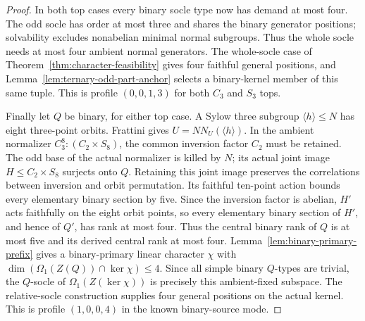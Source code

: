 \begin{proof}
In both top cases every binary socle type now has demand at most four.
The odd socle has order at most three and shares the binary generator
positions; solvability excludes nonabelian minimal normal subgroups.
Thus the whole socle needs at most four ambient normal generators.
The whole-socle case of Theorem~\ref{thm:character-feasibility} gives
four faithful general positions, and
Lemma~\ref{lem:ternary-odd-part-anchor} selects a binary-kernel member
of this same tuple. This is profile $(0,0,1,3)$ for both $C_3$ and
$S_3$ tops.

Finally let $Q$ be binary, for either top case. A Sylow three subgroup
$\langle h\rangle\leq N$ has eight three-point orbits. Frattini gives
$U=N N_U(\langle h\rangle)$. In the ambient normalizer
$C_3^8:(C_2\times S_8)$, the common inversion factor $C_2$ must be
retained. The odd base of the actual normalizer is killed by $N$;
its actual joint image $H\leq C_2\times S_8$ surjects onto $Q$.
Retaining this joint image preserves the correlations between inversion
and orbit permutation. Its faithful ten-point action bounds every
elementary binary section by five. Since the inversion factor is
abelian, $H'$ acts faithfully on the eight orbit points, so every
elementary binary section of $H'$, and hence of $Q'$, has rank at most
four. Thus the central binary rank of $Q$ is at most five and its
derived central rank at most four. Lemma~\ref{lem:binary-primary-prefix}
gives a binary-primary linear character $\chi$ with
$\dim(\Omega_1(Z(Q))\cap\ker\chi)\leq4$.
Since all simple binary $Q$-types are trivial, the $Q$-socle of
$\Omega_1(Z(\ker\chi))$ is precisely this ambient-fixed subspace.
The relative-socle construction supplies four general positions on
the actual kernel.
This is profile $(1,0,0,4)$ in the known binary-source mode.
\end{proof}

